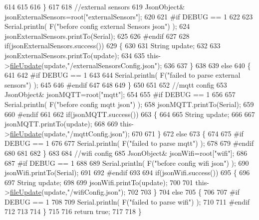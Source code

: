 \begin{DoxyCode}
614 
615 
616     \}
617     
618     \textcolor{comment}{//external sensors}
619         JsonObject& jsonExternalSensors=root[\textcolor{stringliteral}{"externalSensors"}];
620 
621 \textcolor{preprocessor}{#if DEBUG == 1 }
622 
623     Serial.println( F(\textcolor{stringliteral}{"before config external Sensors json"}) );
624     jsonExternalSensors.printTo(Serial);
625 
626 \textcolor{preprocessor}{#endif}
627 
628     \textcolor{keywordflow}{if}(jsonExternalSensors.success())
629     \{
630 
631         String update;
632     
633         jsonExternalSensors.printTo(update);
634 
635         this->\hyperlink{class_cool_file_system_a13f2958f5b87757c31fc53797a30d23a}{fileUpdate}(update,\textcolor{stringliteral}{"/externalSensorsConfig.json"});       
636 
637     \}
638 
639     \textcolor{keywordflow}{else}
640     \{   
641 
642 \textcolor{preprocessor}{    #if DEBUG == 1}
643         
644         Serial.println( F(\textcolor{stringliteral}{"failed to parse external sensors"}) );
645 
646 \textcolor{preprocessor}{    #endif}
647 
648 
649     \}
650 
651     
652     \textcolor{comment}{//mqtt config}
653         JsonObject& jsonMQTT=root[\textcolor{stringliteral}{"mqtt"}];
654     
655 \textcolor{preprocessor}{#if DEBUG == 1 }
656 
657     Serial.println( F(\textcolor{stringliteral}{"before config mqtt json"}) );
658     jsonMQTT.printTo(Serial);
659 
660 \textcolor{preprocessor}{#endif}
661 
662     \textcolor{keywordflow}{if}(jsonMQTT.success())
663     \{
664 
665         String update;
666     
667         jsonMQTT.printTo(update);
668 
669         this->\hyperlink{class_cool_file_system_a13f2958f5b87757c31fc53797a30d23a}{fileUpdate}(update,\textcolor{stringliteral}{"/mqttConfig.json"});      
670 
671     \}
672     \textcolor{keywordflow}{else}
673     \{
674 
675 \textcolor{preprocessor}{    #if DEBUG == 1 }
676 
677         Serial.println( F(\textcolor{stringliteral}{"failed to parse mqtt"}) );
678     
679 \textcolor{preprocessor}{    #endif}
680 
681     
682     \}   
683 
684     \textcolor{comment}{//wifi config}
685         JsonObject& jsonWifi=root[\textcolor{stringliteral}{"wifi"}];
686     
687 \textcolor{preprocessor}{#if DEBUG == 1 }
688 
689     Serial.println( F(\textcolor{stringliteral}{"before config wifi json"}) );
690     jsonWifi.printTo(Serial);
691 
692 \textcolor{preprocessor}{#endif}
693 
694     \textcolor{keywordflow}{if}(jsonWifi.success())
695     \{
696 
697         String update;
698     
699         jsonWifi.printTo(update);
700 
701         this->\hyperlink{class_cool_file_system_a13f2958f5b87757c31fc53797a30d23a}{fileUpdate}(update,\textcolor{stringliteral}{"/wifiConfig.json"});      
702 
703     \}
704     \textcolor{keywordflow}{else}
705     \{
706 
707 \textcolor{preprocessor}{    #if DEBUG == 1 }
708 
709         Serial.println( F(\textcolor{stringliteral}{"failed to parse wifi"}) );
710     
711 \textcolor{preprocessor}{    #endif}
712 
713     
714     \}   
715         
716     \textcolor{keywordflow}{return} \textcolor{keyword}{true};
717 
718 \}   
\end{DoxyCode}
